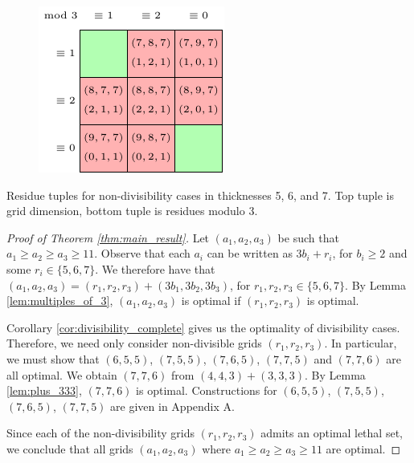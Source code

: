 \begin{table}[]
\begin{subfigure}{0.3\textwidth}
	\label{tab:r_b}
\end{subfigure} \hfill%
\begin{subfigure}{0.3\textwidth}
	\includegraphics[width=\textwidth]{tables/4/residue_1.pdf}
	\label{tab:r_c}
\end{subfigure}
\caption{Residue tuples for non-divisibility cases in thicknesses 5, 6, and 7. Top tuple is grid dimension, bottom tuple is residues modulo 3.}
\label{tab:residues}
\end{table} 

\begin{proof}[Proof of Theorem \ref{thm:main_result}]
Let $(a_1,a_2,a_3)$ be such that $a_1 \geq a_2 \geq a_3 \geq 11$. Observe that each $a_i$ can be written as $3b_i + r_i$, for $b_i \geq 2$ and some $r_i \in \{5,6,7\}$. We therefore have that $(a_1,a_2,a_3) = (r_1,r_2,r_3) + (3b_1,3b_2,3b_3)$, for $r_1,r_2,r_3 \in \{5,6,7\}$. By Lemma \ref{lem:multiples_of_3}, $(a_1,a_2,a_3)$ is optimal if $(r_1,r_2,r_3)$ is optimal. 

Corollary \ref{cor:divisibility_complete} gives us the optimality of divisibility cases. Therefore, we need only consider non-divisible grids $(r_1,r_2,r_3)$. In particular, we must show that $(6,5,5)$, $(7,5,5)$, $(7,6,5)$, $(7,7,5)$ and $(7,7,6)$ are all optimal. We obtain $(7,7,6)$ from $(4,4,3) + (3,3,3)$. By Lemma \ref{lem:plus_333}, $(7,7,6)$ is optimal. Constructions for $(6,5,5)$, $(7,5,5)$, $(7,6,5)$, $(7,7,5)$ are given in Appendix A.

Since each of the non-divisibility grids $(r_1,r_2,r_3)$ admits an optimal lethal set, we conclude that all grids $(a_1,a_2,a_3)$ where $a_1 \geq a_2 \geq a_3 \geq 11$ are optimal.
\end{proof}

